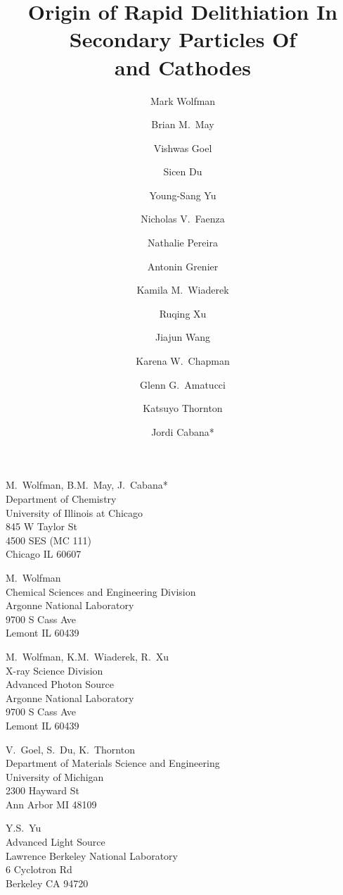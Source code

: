 \documentclass{WileyMSP-template}
\begin{document}
\title{Origin of Rapid Delithiation In Secondary Particles Of \\ \nca{} and \nmc{} Cathodes}

\maketitle

\author{Mark Wolfman}
\author{Brian M.\ May}
\author{Vishwas Goel}
\author{Sicen Du}
\author{Young-Sang Yu}
\author{Nicholas V.\ Faenza}
\author{Nathalie Pereira}
\author{Antonin Grenier}
\author{Kamila M.\ Wiaderek}
\author{Ruqing Xu}
\author{Jiajun Wang}
\author{Karena W.\ Chapman}
\author{Glenn G.\ Amatucci}
\author{Katsuyo Thornton}
\author{Jordi Cabana*}

\begin{affiliations}
  M.\ Wolfman, B.M.\ May, J.\ Cabana* \\
  Department of Chemistry \\
  University of Illinois at Chicago \\
  845 W Taylor St \\
  4500 SES (MC 111) \\
  Chicago IL 60607

  M.\ Wolfman \\
  Chemical Sciences and Engineering Division \\
  Argonne National Laboratory \\
  9700 S Cass Ave \\
  Lemont IL 60439

  M.\ Wolfman, K.M.\ Wiaderek, R.\ Xu \\
  X-ray Science Division \\
  Advanced Photon Source \\
  Argonne National Laboratory \\
  9700 S Cass Ave \\
  Lemont IL 60439

  V.\ Goel, S.\ Du, K.\ Thornton \\
  Department of Materials Science and Engineering \\
  University of Michigan \\
  2300 Hayward St \\
  Ann Arbor MI 48109

  Y.S.\ Yu \\
  Advanced Light Source \\
  Lawrence Berkeley National Laboratory \\
  6 Cyclotron Rd \\
  Berkeley CA 94720


\end{affiliations}
\end{document}

